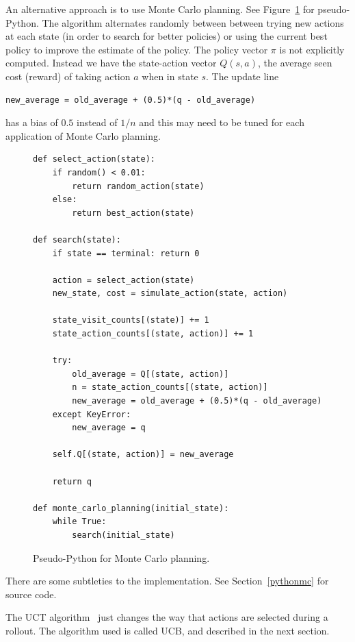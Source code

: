 \documentclass[12pt,amstags,fleqn]{article}
\theoremstyle{plain}
\theoremstyle{definition}
\theoremstyle{definition}
\begin{document}
An alternative approach is to use Monte Carlo planning. See
Figure~\ref{mcplanning} for pseudo-Python. The algorithm alternates randomly
between between trying new actions at each state (in order to search for
better policies) or using the current best policy to improve the
estimate of the policy. The policy vector $\pi$ is not explicitly
computed. Instead we have the state-action vector $Q(s,a)$, the average seen cost (reward) of taking
action $a$ when in state $s$. The update line
\begin{center}
\begin{verbatim}
new_average = old_average + (0.5)*(q - old_average)
\end{verbatim}
\end{center}
has a bias of $0.5$ instead of $1/n$ and this may need to be tuned for
each application of Monte Carlo planning.
\begin{figure}[htb]
\begin{verbatim}
def select_action(state):
    if random() < 0.01:
        return random_action(state)
    else:
        return best_action(state)

def search(state):
    if state == terminal: return 0

    action = select_action(state)
    new_state, cost = simulate_action(state, action)

    state_visit_counts[(state)] += 1
    state_action_counts[(state, action)] += 1

    try:
        old_average = Q[(state, action)]
        n = state_action_counts[(state, action)]
        new_average = old_average + (0.5)*(q - old_average)
    except KeyError:
        new_average = q

    self.Q[(state, action)] = new_average

    return q

def monte_carlo_planning(initial_state):
    while True:
        search(initial_state)

\end{verbatim}
\caption{Pseudo-Python for Monte Carlo planning.}\label{mcplanning}
\end{figure}
There are some subtleties to the implementation. See
Section~\ref{pythonmc} for source code.

The UCT algorithm~\cite{Kocsis06banditbased} just changes the way
that actions are selected during a rollout. The algorithm used is
called UCB, and described in the next section.
\end{document}
